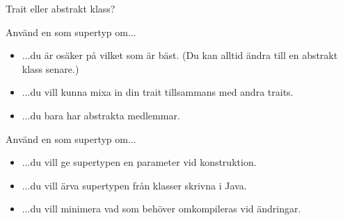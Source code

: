 \begin{Slide}{Trait eller abstrakt klass?} 
\SlideFontSmall
\label{slideW07:traitorclass}
\begin{multicols}{2}
Använd en  som supertyp om...
\begin{itemize}
\item ...du är osäker på vilket som är bäst. (Du kan alltid ändra till en abstrakt klass senare.)
\item ...du vill kunna mixa in din trait tillsammans med andra traits.
\item ...du bara har abstrakta medlemmar. 
\end{itemize}

\columnbreak

Använd en  som supertyp om...
\begin{itemize}
\item ...du vill ge supertypen en parameter vid konstruktion.
\item ...du vill ärva supertypen från klasser skrivna i Java.
\item ...du vill minimera vad som behöver omkompileras vid ändringar. 
\end{itemize}


\end{multicols}
\end{Slide}
















